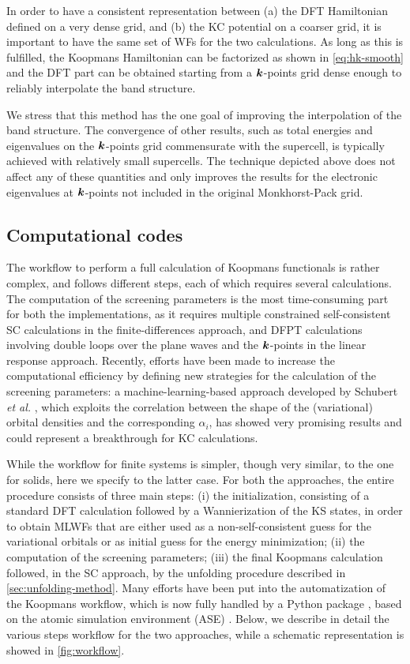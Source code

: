 In order to have a consistent representation between (a) the DFT Hamiltonian defined  on a very dense grid, and (b) the KC potential on a coarser grid, it is important to have the same set of WFs for the two calculations. As long as this is fulfilled, the Koopmans Hamiltonian can be factorized as shown in \cref{eq:hk-smooth} and the DFT part can be obtained starting from a ${\bm k}$-points grid dense enough to reliably interpolate the band structure.

We stress that this method has the one goal of improving the interpolation of the band structure. The convergence of other results, such as total energies and eigenvalues on the ${\bm k}$-points grid commensurate with the supercell, is typically achieved with relatively small supercells. The technique depicted above does not affect any of these quantities and only improves the results for the electronic eigenvalues at ${\bm k}$-points not included in the original Monkhorst-Pack grid.

\subsection{Computational codes\label{sec:computational-codes}}
The workflow to perform a full calculation of Koopmans functionals is rather complex, and follows different steps, each of which requires several calculations. The computation of the screening parameters is the most time-consuming part for both the implementations, as it requires multiple constrained self-consistent SC calculations in the finite-differences approach, and DFPT calculations involving double loops over the plane waves and the ${\bm k}$-points in the linear response approach. Recently, efforts have been made to increase the computational efficiency by defining new strategies for the calculation of the screening parameters: a machine-learning-based approach developed by Schubert \emph{et al.} \cite{schubert_ml_2022}, which exploits the correlation between the shape of the (variational) orbital densities and the corresponding $\alpha_i$, has showed very promising results and could represent a breakthrough for KC calculations.

While the workflow for finite systems is simpler, though very similar, to the one for solids, here we specify to the latter case. For both the approaches, the entire procedure consists of three main steps: (i) the initialization, consisting of a standard DFT calculation followed by a Wannierization of the KS states, in order to obtain MLWFs that are either used as a non-self-consistent guess for the variational orbitals or as initial guess for the energy minimization; (ii) the computation of the screening parameters; (iii) the final Koopmans calculation followed, in the SC approach, by the unfolding procedure described in \cref{sec:unfolding-method}. Many efforts have been put into the automatization of the Koopmans workflow, which is now fully handled by a Python package \cite{linscott_koopmans_2022}, based on the atomic simulation environment (ASE) \cite{larsen_atomic_2017}. Below, we describe in detail the various steps workflow for the two approaches, while a schematic representation is showed in \cref{fig:workflow}.

